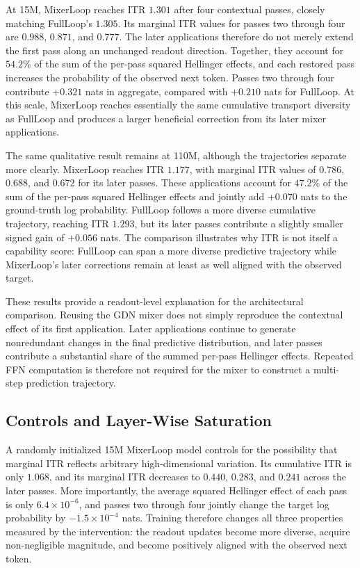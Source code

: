 \documentclass[letterpaper]{article} %
\begin{document}
At 15M, MixerLoop reaches ITR $1.301$ after four contextual passes, closely
matching FullLoop's $1.305$. Its marginal ITR values for passes two through four
are $0.988$, $0.871$, and $0.777$. The later applications therefore do not
merely extend the first pass along an unchanged readout direction. Together,
they account for $54.2\%$ of the sum of the per-pass squared Hellinger effects,
and each restored pass increases the probability of the observed next token.
Passes two through four contribute $+0.321$ nats in aggregate, compared with
$+0.210$ nats for FullLoop. At this scale, MixerLoop reaches essentially the
same cumulative transport diversity as FullLoop and produces a larger
beneficial correction from its later mixer applications.

The same qualitative result remains at 110M, although the trajectories separate
more clearly. MixerLoop reaches ITR $1.177$, with marginal ITR values of
$0.786$, $0.688$, and $0.672$ for its later passes. These applications account
for $47.2\%$ of the sum of the per-pass squared Hellinger effects and jointly
add $+0.070$ nats to the ground-truth log probability. FullLoop follows a more
diverse cumulative trajectory, reaching ITR $1.293$, but its later passes
contribute a slightly smaller signed gain of $+0.056$ nats. The comparison
illustrates why ITR is not itself a capability score: FullLoop can span a more
diverse predictive trajectory while MixerLoop's later corrections remain at
least as well aligned with the observed target.

These results provide a readout-level explanation for the architectural
comparison. Reusing the GDN mixer does not simply reproduce the contextual
effect of its first application. Later applications continue to generate
nonredundant changes in the final predictive distribution, and later passes
contribute a substantial share of the summed per-pass Hellinger effects.
Repeated FFN computation is therefore not required for the mixer to construct a
multi-step prediction trajectory.

\subsection{Controls and Layer-Wise Saturation}

A randomly initialized 15M MixerLoop model controls for the possibility that
marginal ITR reflects arbitrary high-dimensional variation. Its cumulative ITR
is only $1.068$, and its marginal ITR decreases to $0.440$, $0.283$, and
$0.241$ across the later passes. More importantly, the average squared
Hellinger effect of each pass is only $6.4\times10^{-6}$, and passes two through
four jointly change the target log probability by $-1.5\times10^{-4}$ nats.
Training therefore changes all three properties measured by the intervention:
the readout updates become more diverse, acquire non-negligible magnitude, and
become positively aligned with the observed next token.
\end{document}
